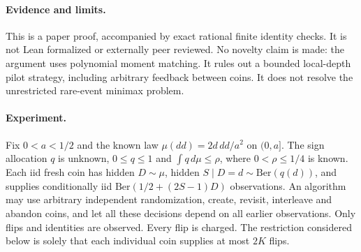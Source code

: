 
\paragraph{Evidence and limits.}
This is a paper proof, accompanied by exact rational finite identity checks.
It is not Lean formalized or externally peer reviewed. No novelty claim is
made: the argument uses polynomial moment matching. It rules out a bounded
local-depth pilot strategy, including arbitrary feedback between coins. It
does not resolve the unrestricted rare-event minimax problem.

\paragraph{Experiment.}
Fix $0<a<1/2$ and the known law $\mu(dd)=2d\,dd/a^2$ on $(0,a]$.
The sign allocation $q$ is unknown, $0\le q\le1$ and $\int q\,d\mu\le\rho$,
where $0<\rho\le1/4$ is known. Each iid fresh coin has hidden $D\sim\mu$,
hidden $S\mid D=d\sim\mathrm{Ber}(q(d))$, and supplies conditionally iid
$\mathrm{Ber}(1/2+(2S-1)D)$ observations. An algorithm may use arbitrary
independent randomization, create, revisit, interleave and abandon coins, and
let all these decisions depend on all earlier observations. Only flips and
identities are observed. Every flip is charged. The restriction considered
below is solely that each individual coin supplies at most $2K$ flips.

